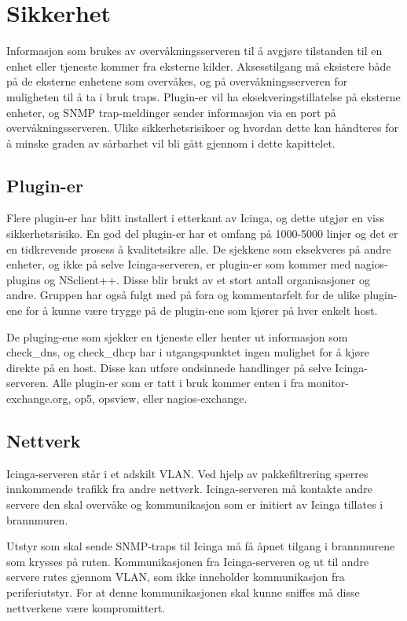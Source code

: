 \chapter{Sikkerhet}\label{chap:sikkerhet}
Informasjon som brukes av overvåkningsserveren til å avgjøre tilstanden til en enhet eller tjeneste kommer fra eksterne kilder. Aksesstilgang må eksistere både på de eksterne enhetene som overvåkes, og på overvåkningsserveren for muligheten til å ta i bruk traps. Plugin-er vil ha eksekveringstillatelse på eksterne enheter, og SNMP trap-meldinger sender informasjon via en port på overvåkningsserveren. Ulike sikkerhetsrisikoer og hvordan dette kan håndteres for å minske graden av sårbarhet vil bli gått gjennom i dette kapittelet.

\section{Plugin-er}
Flere plugin-er har blitt installert i etterkant av Icinga, og dette utgjør en viss sikkerhetsrisiko. En god del plugin-er har et omfang på 1000-5000 linjer og det er en tidkrevende prosess å kvalitetsikre alle. De sjekkene som eksekveres på andre enheter, og ikke på selve Icinga-serveren, er plugin-er som kommer med nagios-plugins og NSclient++. Disse blir brukt av et stort antall organisasjoner og andre. Gruppen har også fulgt med på fora og kommentarfelt for de ulike plugin-ene for å kunne være trygge på de plugin-ene som kjører på hver enkelt host. 

De pluging-ene som sjekker en tjeneste eller henter ut informasjon som check\_dns, og check\_dhcp har i utgangspunktet ingen mulighet for å kjøre direkte på en host. Disse kan utføre ondsinnede handlinger på selve Icinga-serveren. Alle plugin-er som er tatt i bruk kommer enten i fra monitor-exchange.org, op5, opsview, eller nagios-exchange.
\section{Nettverk}
Icinga-serveren står i et adskilt VLAN. Ved hjelp av pakkefiltrering sperres innkommende trafikk fra andre nettverk. Icinga-serveren må kontakte andre servere den skal overvåke og kommunikasjon som er initiert av Icinga tillates i brannmuren. 

Utstyr som skal sende SNMP-traps til Icinga må få åpnet tilgang i brannmurene som krysses på ruten. Kommunikasjonen fra Icinga-serveren og ut til andre servere rutes gjennom VLAN, som ikke inneholder kommunikasjon fra periferiutstyr. For at denne kommunikasjonen skal kunne sniffes må disse nettverkene være kompromittert.
